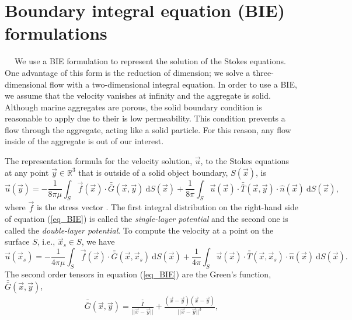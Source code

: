 \section{Boundary integral equation (BIE) formulations} 
$\ \ \ \ $ 
We use a BIE formulation to represent the solution of the Stokes equations. One advantage of this form is the reduction of dimension; we solve a three-dimensional flow with a two-dimensional integral equation. 
In order to use a BIE, we assume that the velocity vanishes at infinity and the aggregate is solid. Although marine aggregates are porous, the solid boundary condition is reasonable to apply due to their is low permeability. This condition prevents a flow through the aggregate, acting like a solid particle. For this reason, any flow inside of the aggregate is out of our interest.  
\par
The representation formula for the velocity solution, $\vec{u}$, to the Stokes equations at any point $\vec{y} \in \mathbb{R}^3$ that is outside of a solid object boundary, $S(\vec{x})$, is
\begin{equation}
   \vec{u}(\vec{y}) =
	- \frac{1}{8 \pi \mu} \int_S  \vec{f}(\vec{x}) \cdot \bar{\bar{G}}(\vec{x},\vec{y}) \ \text{d}S(\vec{x}) 
+ \frac{1}{8 \pi} \int_S
\vec{u}(\vec{x}) \cdot  \bar{\bar{T}}(\vec{x},\vec{y})  
\cdot \hat{n} ( \vec{x})
\ \text{d}S(\vec{x}),
\label{eq_BIE}
\end{equation}
where  $\vec{f}$ is the stress vector \cite{pozrikidis_boundary_1992}.
The first integral distribution on the right-hand side of equation (\ref{eq_BIE}) is called the \textit{single-layer potential} and the second one is called the \textit{double-layer potential}. 
To compute the velocity at a point on the surface $S$, i.e., $ \vec{x}_s \in S$, we have 
\begin{equation}
   \vec{u}(\vec{x}_s) = - \frac{1}{4 \pi \mu} \int_S  \vec{f}(\vec{x}) \cdot \bar{\bar{G}}(\vec{x},\vec{x}_s) \ \text{d}S(\vec{x}) 
+ \frac{1}{4 \pi} 
\int_S
\vec{u}(\vec{x}) \cdot  \bar{\bar{T}}(\vec{x},\vec{x}_s)  
\cdot \hat{n} ( \vec{x})
\ \text{d}S(\vec{x}).
\label{eq_BIE_onS}
\end{equation}
The second order tensors in equation (\ref{eq_BIE}) are the Green's function,  $\bar{\bar{G}}(\vec{x},\vec{y})$,
\begin{align}
  \bar{\bar{G}}(\vec{x},\vec{y}) =   
  \frac{\bar{\bar{I}}}{||\vec{x}-\vec{y}||} + \frac{(\vec{x}-\vec{y})(\vec{x}-\vec{y})}{||\vec{x}-\vec{y}||^3},
  \label{eq_stokeslet}
  \end{align}
